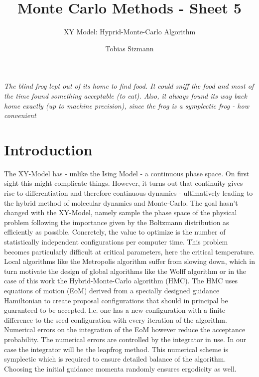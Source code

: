\documentclass[11pt, a4paper]{scrartcl}
\title{Monte Carlo Methods - Sheet 5}
\subtitle{XY Model: Hyprid-Monte-Carlo Algorithm}
\author{Tobias Sizmann}
\begin{document}
\maketitle
\textit{The blind frog lept out of its home to find food. It could sniff the food and most of the time found something acceptable (to eat). Also, it always found its way back home exactly (up to machine precision), since the frog is a symplectic frog - how convenient}
\section{Introduction}
    The XY-Model has - unlike the Ising Model - a continuous phase space. On first sight this might complicate things. However, it turns out that continuity gives rise to differentiation and therefore continuous dynamics - ultimatively leading to the hybrid method of molecular dynamics and Monte-Carlo. The goal hasn't changed with the XY-Model, namely sample the phase space of the physical problem following the importance given by the Boltzmann distribution as efficiently as possible. Concretely, the value to optimize is the number of statistically independent configurations per computer time. This problem becomes particularly difficult at critical parameters, here the critical temperature. Local algorithms like the Metropolis algorithm suffer from slowing down, which in turn motivate the design of global algorithms like the Wolff algorithm or in the case of this work the Hybrid-Monte-Carlo algorithm (HMC). The HMC uses equations of motion (EoM) derived from a specially designed guidance Hamiltonian to create proposal configurations that should in principal be guaranteed to be accepted. I.e. one has a new configuration with a finite difference to the seed configuration with every iteration of the algorithm. Numerical errors on the integration of the EoM however reduce the acceptance probability. The numerical errors are controlled by the integrator in use. In our case the integrator will be the leapfrog method. This numerical scheme is symplectic which is required to ensure detailed balance of the algorithm. Choosing the initial guidance momenta randomly ensures ergodicity as well.
\end{document}
